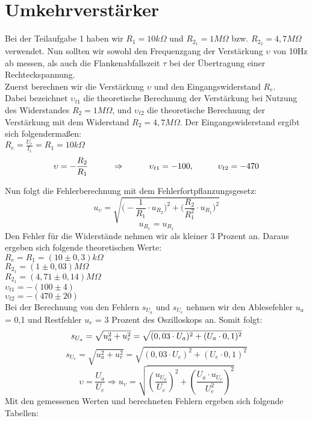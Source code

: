 

\section{Umkehrverstärker}
Bei der Teilaufgabe 1 haben wir $R_1=10k\Omega$ und $R_{2_1}=1M\Omega$ bzw. $R_{2_2}=4,7M\Omega$ verwendet. Nun sollten wir sowohl den Frequenzgang der Verstärkung $\upsilon$ von 10Hz ab messen, als auch die Flankenabfallszeit $\tau$ bei der Übertragung einer Rechteckspannung.\\
Zuerst berechnen wir die Verstärkung $\upsilon$ und den Eingangswiderstand $R_e$. \\
Dabei bezeichnet $\upsilon_{t1}$ die theoretische Berechnung der Verstärkung bei Nutzung des Widerstandes $R_2=1M\Omega$, und $\upsilon_{t2}$ die theoretische Berechnung der Verstärkung mit dem Widerstand $R_2=4,7M\Omega$. Der Eingangswiderstand ergibt sich folgendermaßen: \\
$R_e=\frac{U_e}{I_1}=R_1=10k\Omega$
\begin{equation}
\upsilon=-\frac{R_2}{R_1} \hspace*{1cm} \Rightarrow \hspace*{1cm} \upsilon_{t1}= -100, \hspace*{1cm} \upsilon_{t2}=-470
\end{equation}


Nun folgt die Fehlerberechnung mit dem Fehlerfortpflanzungsgesetz:
\begin{equation}
u_{\upsilon}=\sqrt{\bigl(-\frac{1}{R_1}\cdot u_{R_2}\bigr)^2 + {\bigl(\frac{R_2}{R_1^2}\cdot u_{R_1}\bigr)^2}}
\end{equation}
\begin{equation}
u_{R_e}=u_{R_1}
\end{equation}
Den Fehler für die Widerstände nehmen wir als kleiner 3 Prozent an. Daraus ergeben sich folgende theoretischen Werte:\\
$R_e=R_1=(10\pm 0,3)k\Omega$\\
$R_{2_1}=(1\pm 0,03)M\Omega$\\
$R_{2_1}=(4,71\pm 0,14)M\Omega$\\
$\upsilon_{t1}=-(100\pm4)$\\
$\upsilon_{t2}=-(470\pm20)$\\
Bei der Berechnung von den Fehlern $s_{U_a}$ und $s_{U_e}$ nehmen wir den Ablesefehler $u_a$= 0,1 und Restfehler $u_r$ = 3 Prozent des Oszilloskops an. Somit folgt:
\begin{equation}
s_{U_a}=\sqrt{u_a^2+u_r^2}=\sqrt{(0,03 \cdot U_a)^2+(U_a\cdot 0,1)^2} \\
\end{equation}
\begin{equation}
s_{U_e}=\sqrt{u_a^2+u_r^2}=\sqrt{(0,03 \cdot U_e)^2+(U_e \cdot 0,1)^2} 
\end{equation}
\begin{equation}
\upsilon=\frac{U_a}{U_e} \Rightarrow u_\upsilon=\sqrt{(\frac{u_{U_a}}{U_e})^2+(\frac{U_a \cdot u_{U_e}}{U_e^2})^2}
\end{equation}
Mit den gemessenen Werten und berechneten Fehlern ergeben sich folgende Tabellen:

